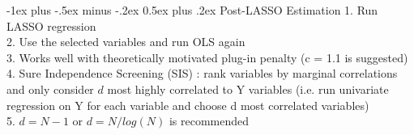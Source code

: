 \documentclass[10pt,landscape]{article}
\makeatletter
\renewcommand{\section}{\@startsection{section}{1}{0mm}%
                                {-1ex plus -.5ex minus -.2ex}%
                                {0.5ex plus .2ex}%
                                {\normalfont\large\bfseries}}
\makeatother
\begin{document}
\begin{multicols}{4}
\section{Post-LASSO Estimation}
1. Run LASSO regression\\
2. Use the selected variables and run OLS again\\
3. Works well with theoretically motivated plug-in penalty (c = 1.1 is suggested)\\
4. Sure Independence Screening (SIS) : rank variables by marginal correlations and only consider $d$ most highly correlated to Y variables (i.e. run univariate regression on Y for each variable and choose d most correlated variables)\\
5. $d = N-1$ or $d = N/log(N)$ is recommended\\


\end{multicols}
\end{document}
